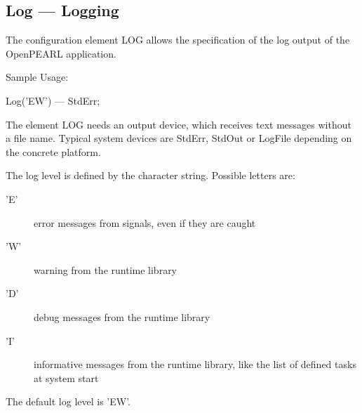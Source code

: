 
\subsection{Log --- Logging}
The configuration element LOG allows the specification of the 
log output of the OpenPEARL application.

Sample Usage:
\begin{PEARLCode}
Log('EW') --- StdErr;
\end{PEARLCode}

The element LOG needs an output device,
which receives text messages without a file name.
Typical system devices are StdErr, StdOut or LogFile depending on the concrete 
platform. 

The log level is defined by the character string. Possible letters are:
\begin{description}
\item['E'] error messages from signals, even if they are caught
\item['W'] warning from the runtime library
\item['D'] debug messages from the runtime library
\item['I'] informative messages from the runtime library, like the 
    list of defined tasks at system start
\end{description}

The default log level is 'EW'.

